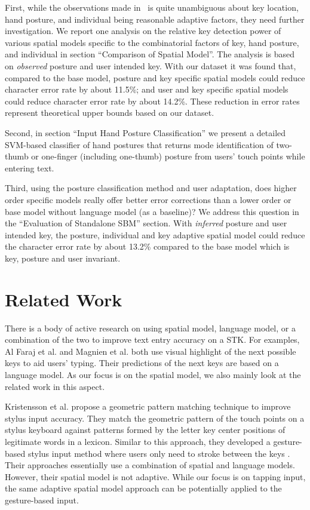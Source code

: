 \documentclass{sigchi}
\begin{document}
First, while the observations made in~\cite{Azenkot:2012} is quite unambiguous 
about key location, hand posture, and individual being reasonable adaptive 
factors, they need further investigation.  We report one analysis on the 
relative key detection power of various spatial models specific to the 
combinatorial factors of key, hand posture, and individual in section 
``Comparison of Spatial Model''. The analysis is based on \textit{observed} 
posture and user intended key. With our dataset it was found that, compared to
the base model, posture and key specific spatial models could reduce character
error rate by about 11.5\%; and user and key specific spatial models could
reduce character error rate by about 14.2\%. These reduction in error rates
represent theoretical upper bounds based on our dataset.

Second, in section ``Input Hand Posture Classification'' we present a detailed 
SVM-based classifier of hand postures that returns mode identification of 
two-thumb or one-finger (including one-thumb) posture from users' touch points while entering text.

Third, using the posture classification method and user adaptation, does higher 
order specific models really offer better error corrections than a lower order 
or base model without language model (as a baseline)? We address this question 
in the ``Evaluation of Standalone SBM'' section. With \textit{inferred} posture 
and user intended key, the posture, individual and key adaptive spatial model 
could reduce the character error rate by about 13.2\% compared to
the base model which is key, posture and user invariant.

\section{Related Work}

There is a body of active research on using spatial model, language model, or a combination
of the two to improve text entry accuracy on a STK. For examples, 
Al Faraj et al. \cite{AlFaraj:2009} and Magnien et al. \cite{Magnien:2004} both use
visual highlight of the next possible keys to aid users' typing. Their predictions of the next keys are based on a language model. As our focus is on the 
spatial model, we also mainly look at the related work in this aspect.    

Kristensson et al. \cite{Kristensson:2005} propose a geometric pattern matching technique to improve 
stylus input accuracy. They match the geometric pattern of the touch points on a stylus keyboard against patterns formed by 
the letter key center positions of legitimate words in a lexicon. Similar to this approach,
they developed a gesture-based stylus input method where users only need to stroke between the keys \cite{Kristensson:2004}.
Their approaches essentially use a combination of spatial and language models. However, 
their spatial model is not adaptive. While our focus is on tapping input, the same adaptive spatial model approach
can be potentially applied to the gesture-based input.
\end{document}
